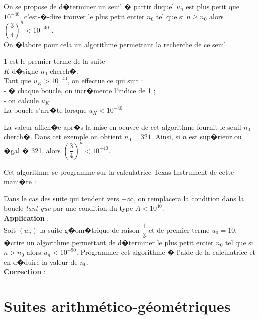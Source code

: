 \documentclass[a4paper,12pt,twoside,french]{extarticle}
\begin{document}
\noindent On se propose de d�terminer un seuil � partir duquel $u_n$ est plus petit que $10^{-40}$, c'est-�-dire trouver le plus petit entier $n_0$ tel que si $n \geqslant n_0$  alors $\left(\dfrac{3}{4}\right)^n<10^{-40}$ .\\

\noindent On �labore pour cela un algorithme permettant la recherche de ce seuil 
\begin{multicols}{2}
\medskip


\columnbreak


\noindent \vphantom{\LARGE A}1 est le premier terme de la suite\\
$K$ d�signe $n_0$ cherch�.\\
Tant que $u_K > 10^{-40}$, on effectue ce qui suit :\\
- � chaque boucle, on incr�mente l'indice de 1 ;\\
- on calcule $u_K$ \\
La boucle s'arr�te lorsque $u_K<10^{-40}$
\end{multicols}
\noindent La valeur affich�e apr�s la mise en oeuvre de cet algorithme fournit le seuil $n_0$ cherch�. Dans cet exemple on obtient $n_0=321$. Ainsi, si $n$ est sup�rieur ou �gal � 321, alors $\left(\dfrac{3}{4}\right)^n < 10^{-40}$.

\noindent Cet algorithme se programme sur la calculatrice Texas Instrument de cette mani�re :


\noindent Dans le cas des suite qui tendent vers $+\infty$, on remplacera la condition dans la boucle \emph{tant que} par une condition du type $A<10^{40}$.\\ 

\noindent \textbf{Application} : \\

\noindent Soit $(u_n)$ la suite g�om�trique de raison $\dfrac{1}{3}$ et de premier terme $u_0=10$.\\
\noindent �crire un algorithme permettant de d�terminer le plus petit entier $n_0$ tel que si $n > n_0$ alors $u_n < 10^{-90}$. Programmer cet algorithme � l'aide de la calculatrice et en d�duire la valeur de $n_0$.\\


\noindent \textbf{Correction} :\\


\section{Suites arithmético-géométriques}
\end{document}

